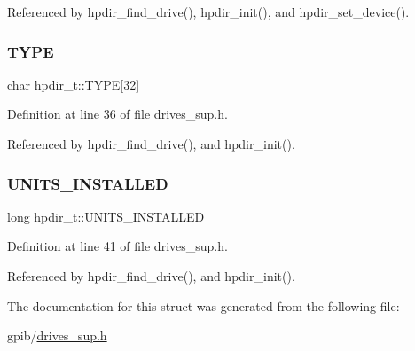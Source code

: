 Referenced by hpdir\+\_\+find\+\_\+drive(), hpdir\+\_\+init(), and hpdir\+\_\+set\+\_\+device().

\mbox{\label{structhpdir__t_ad2f925b088d4fd746c9ea789f34f9507}} 
\subsubsection{\texorpdfstring{T\+Y\+PE}{TYPE}}
{\footnotesize\ttfamily char hpdir\+\_\+t\+::\+T\+Y\+PE\mbox{[}32\mbox{]}}



Definition at line 36 of file drives\+\_\+sup.\+h.



Referenced by hpdir\+\_\+find\+\_\+drive(), and hpdir\+\_\+init().

\mbox{\label{structhpdir__t_a748150d5e0351e2d827f2a4def385ca9}} 
\subsubsection{\texorpdfstring{U\+N\+I\+T\+S\+\_\+\+I\+N\+S\+T\+A\+L\+L\+ED}{UNITS\_INSTALLED}}
{\footnotesize\ttfamily long hpdir\+\_\+t\+::\+U\+N\+I\+T\+S\+\_\+\+I\+N\+S\+T\+A\+L\+L\+ED}



Definition at line 41 of file drives\+\_\+sup.\+h.



Referenced by hpdir\+\_\+find\+\_\+drive(), and hpdir\+\_\+init().



The documentation for this struct was generated from the following file\+:\begin{DoxyCompactItemize}
\item 
gpib/\hyperlink{drives__sup_8h}{drives\+\_\+sup.\+h}\end{DoxyCompactItemize}
